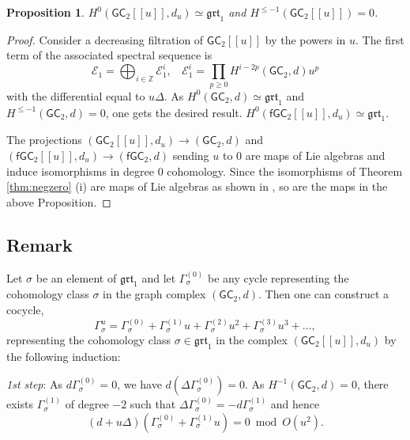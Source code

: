 \documentclass{amsart}
\theoremstyle{plain}
\newtheorem{proposition}[theorem]{Proposition}
\theoremstyle{definition}
\begin{document}
\begin{proposition}\label{2: prop on grt}
$H^0\left({{\mathsf G}}{{\mathsf C}}_2[[u]], d_u\right)\simeq {{\mathfrak{{grt}}}_1}$ and $H^{\leq -1}\left({{\mathsf G}}{{\mathsf C}}_2[[u]]\right)=0$.
\end{proposition}
\begin{proof}
Consider a decreasing filtration of ${{\mathsf G}}{{\mathsf C}}_2[[{u}]]$ by the powers in ${u}$. The first term of the associated spectral sequence is
$$
{{\mathcal E}}_1= \bigoplus_{i\in {{\mathbb Z}}} {{\mathcal E}}_1^i,\ \ \ \ {{\mathcal E}}_1^i=\prod_{p\geq 0} H^{i-2p}({{\mathsf G}}{{\mathsf C}}_2, d) u^p
$$
with the differential equal to $u\Delta$.
As $H^0({{\mathsf G}}{{\mathsf C}}_2, d)\simeq {{\mathfrak{{grt}}}_1}$
and $H^{\leq -1}({{\mathsf G}}{{\mathsf C}}_2, d)=0$, one gets the desired result.  
$H^0\left({{\mathsf f}}{{\mathsf G}}{{\mathsf C}}_2[[u]], d_u\right)\simeq {{\mathfrak{{grt}}}_1}$.

The projections $({{\mathsf G}}{{\mathsf C}}_2[[u]],d_u)\to ({{\mathsf G}}{{\mathsf C}}_2,d)$ and $({{\mathsf f}}{{\mathsf G}}{{\mathsf C}}_2[[u]],d_u)\to ({{\mathsf f}}{{\mathsf G}}{{\mathsf C}}_2,d)$ sending $u$ to 0 are maps of Lie algebras and induce isomorphisms in degree 0 cohomology. Since the isomorphisms of Theorem {\ref{thm:negzero}} (i) are maps of Lie algebras as shown in \cite{Wi}, so are the maps in the above Proposition.
\end{proof}

\subsection{Remark}\label{2:Remark on induction}  Let $\sigma$ be an element of ${{\mathfrak{{grt}}}_1}$ and let ${\Gamma}_\sigma^{(0)}$ be any cycle representing the cohomology class  $\sigma$  in the graph complex
$({{\mathsf G}}{{\mathsf C}}_2, d)$.
Then one can construct a cocycle,
\begin{equation}\label{cyclic_repr}
\Gamma^{u}_\sigma= {\Gamma}_\sigma^{(0)}  + {\Gamma}_\sigma^{(1)}{u} +  {\Gamma}_\sigma^{(2)}{u}^2 +  {\Gamma}_\sigma^{(3)}{u}^3+ \ldots,
\end{equation}
 representing the cohomology class $\sigma\in{{\mathfrak{{grt}}}_1}$ in the complex $\left({{\mathsf G}}{{\mathsf C}}_2[[u]], d_u\right)$ by the following induction:
{\smallskip}

{\em 1st step}: As $d{\Gamma}_\sigma^{(0)}=0$, we have $d (\Delta {\Gamma}_\sigma^{(0)})=0$. As $H^{-1}( {{\mathsf G}}{{\mathsf C}}_2, d)=0$,
there exists ${\Gamma}_\sigma^{(1)}$ of degree $-2$ such that $\Delta {\Gamma}_\sigma^{(0)}= - d{\Gamma}_\sigma^{(1)}$ and hence
$$
(d +u \Delta) \left({\Gamma}_\sigma^{(0)}  + {\Gamma}_\sigma^{(1)}{u}\right)=0 \bmod O({u}^2).
$$
\end{document}
